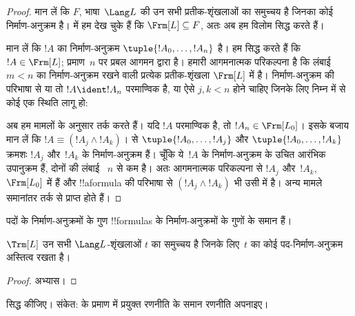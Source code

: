 \documentclass[../../../include/open-logic-section]{subfiles}
\begin{document}
\begin{proof}
मान लें कि $F$, भाषा~$\Lang L$ की उन सभी प्रतीक-शृंखलाओं का समुच्चय है जिनका
कोई निर्माण-अनुक्रम है।  में हम देख चुके
हैं कि $\Frm[L] \subseteq F$, अतः अब हम विलोम सिद्ध करते हैं।

मान लें कि $!A$ का निर्माण-अनुक्रम $\tuple{!A_0,\dotsc,!A_n}$ है। हम सिद्ध
करते हैं कि $!A \in \Frm[L]$; प्रमाण~$n$ पर प्रबल आगमन द्वारा है। हमारी आगमनात्मक
परिकल्पना है कि लंबाई $m < n$ का निर्माण-अनुक्रम रखने वाली प्रत्येक
प्रतीक-शृंखला $\Frm[L]$ में है। निर्माण-अनुक्रम की परिभाषा से या तो $!A \ident !A_n$
परमाण्विक है, या ऐसे $j,k < n$ होने चाहिए जिनके लिए निम्न में
से कोई एक स्थिति लागू हो:
\begin{enumerate}
\end{enumerate}
अब हम मामलों के अनुसार तर्क करते हैं। यदि $!A$ परमाण्विक है, तो $!A_n \in \Frm[L_0]$।
इसके बजाय मान लें कि $!A \equiv (!A_j \land !A_k)$।
 से $\tuple{!A_0,\dotsc,!A_j}$ और
$\tuple{!A_0,\dotsc,!A_k}$ क्रमशः $!A_j$ और~$!A_k$ के निर्माण-अनुक्रम हैं।
चूँकि ये~$!A$ के निर्माण-अनुक्रम के उचित आरंभिक उपानुक्रम हैं, दोनों की लंबाई
~$n$ से कम है। अतः आगमनात्मक परिकल्पना से $!A_j$ और~$!A_k$,
~$\Frm[L_0]$ में हैं और !!a{formula} की परिभाषा से $(!A_j \land !A_k)$ भी
उसी में है। अन्य मामले समानांतर तर्क से प्राप्त होते हैं।
\end{proof}

पदों के निर्माण-अनुक्रमों के गुण !!{formula}s के निर्माण-अनुक्रमों के गुणों
के समान हैं।

\begin{prop}
$\Trm[L]$ उन सभी $\Lang L$-शृंखलाओं $t$ का समुच्चय है जिनके लिए~$t$ का
कोई पद-निर्माण-अनुक्रम अस्तित्व रखता है।
\end{prop}

\begin{proof}
अभ्यास।
\end{proof}

\begin{prob}
 सिद्ध कीजिए। संकेत:
 के प्रमाण में प्रयुक्त रणनीति के
समान रणनीति अपनाइए।
\end{prob}
\end{document}
